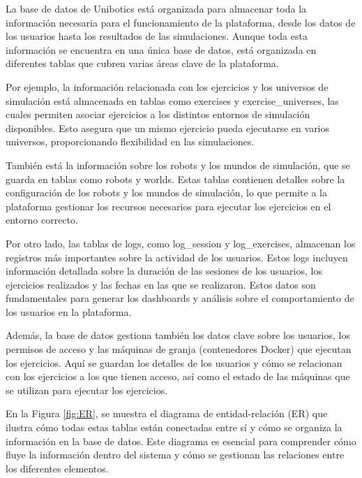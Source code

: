 \documentclass[a4paper, 12pt]{book}
\begin{document}
La base de datos de Unibotics está organizada para almacenar toda la información necesaria para el funcionamiento de la plataforma, desde los datos de los usuarios hasta los resultados de las simulaciones. Aunque toda esta información se encuentra en una única base de datos, está organizada en diferentes tablas que cubren varias áreas clave de la plataforma.

Por ejemplo, la información relacionada con los ejercicios y los universos de simulación está almacenada en tablas como exercises y exercise\_universes, las cuales permiten asociar ejercicios a los distintos entornos de simulación disponibles. Esto asegura que un mismo ejercicio pueda ejecutarse en varios universos, proporcionando flexibilidad en las simulaciones.

También está la información sobre los robots y los mundos de simulación, que se guarda en tablas como robots y worlds. Estas tablas contienen detalles sobre la configuración de los robots y los mundos de simulación, lo que permite a la plataforma gestionar los recursos necesarios para ejecutar los ejercicios en el entorno correcto.

Por otro lado, las tablas de logs, como log\_session y log\_exercises, almacenan los registros más importantes sobre la actividad de los usuarios. Estos logs incluyen información detallada sobre la duración de las sesiones de los usuarios, los ejercicios realizados y las fechas en las que se realizaron. Estos datos son fundamentales para generar los dashboards y análisis sobre el comportamiento de los usuarios en la plataforma.

Además, la base de datos gestiona también los datos clave sobre los usuarios, los permisos de acceso y las máquinas de granja (contenedores Docker) que ejecutan los ejercicios. Aquí se guardan los detalles de los usuarios y cómo se relacionan con los ejercicios a los que tienen acceso, así como el estado de las máquinas que se utilizan para ejecutar los ejercicios.

En la Figura \ref{fig:ER}, se muestra el diagrama de entidad-relación (ER) que ilustra cómo todas estas tablas están conectadas entre sí y cómo se organiza la información en la base de datos. Este diagrama es esencial para comprender cómo fluye la información dentro del sistema y cómo se gestionan las relaciones entre los diferentes elementos.
\end{document}
